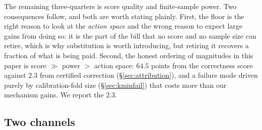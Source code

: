 \documentclass[review,number,doubleblind]{elsarticle}
\theoremstyle{plain}
\theoremstyle{definition}
\theoremstyle{remark}
\begin{document}
\begin{table}[t]
\centering
\caption{The abstention floor against the abstention actually incurred by our filtering
pipeline at $\alpha=0.10$ (Table~\ref{tab:ccrc}). The floor is real and irreducible, and it is
a minority of the bill.}
\label{tab:floorbite}
\small
{}
\end{table}

The remaining three-quarters is score quality and finite-sample power. Two consequences follow,
and both are worth stating plainly. First, the floor is the
right reason to look at the \emph{action space} and the wrong reason to expect large gains from
doing so: it is the part of the bill that no score and no sample size can retire, which is why
substitution is worth introducing, but retiring it recovers a fraction of what is being paid.
Second, the honest ordering of magnitudes in this paper is score $\gg$ power $>$ action space:
$64.5$ points from the correctness score against $2.3$ from certified correction
(\S\ref{sec:attribution}), and a failure mode driven purely by calibration-fold size
(\S\ref{sec:kminfail}) that costs more than our mechanism gains. We report the $2.3$.

\subsection{Two channels}
\end{document}
